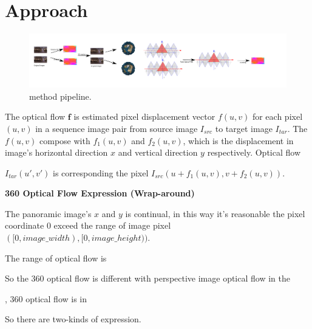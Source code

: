 \section{Approach}\label{sec:approach}



\begin{figure}[hbt!]
	\centering
	\includegraphics[width=0.95\linewidth]{images/method_pipeline_0.pdf}
	\caption{method pipeline. }
\label{fig:approach:pipeline}
\end{figure}




The optical flow $\textbf{f}$ is estimated pixel displacement vector $f(u,v)$ for each pixel $(u,v)$ in a sequence image pair from source image $I_{src}$ to target image $I_{tar}$.
The $f(u,v)$ compose with $f_1(u,v)$ and $f_2(u,v)$, which is the displacement in image's horizontal direction $x$ and vertical direction $y$ respectively.
Optical flow 

$I_{tar}(u',v')$ is corresponding the pixel $I_{src}(u + f_1(u,v), v + f_2(u,v))$.



\textbf{360 Optical Flow Expression (Wrap-around)}

The panoramic image's $x$ and $y$ is continual, in this way it's reasonable the pixel coordinate 0 exceed the range of image pixel $([0, image\_width), [0, image\_height))$. 

The range of optical flow is 

So the 360 optical flow is different with perspective image optical flow in the 

, 360 optical flow is  in 

So there are two-kinds of expression.

